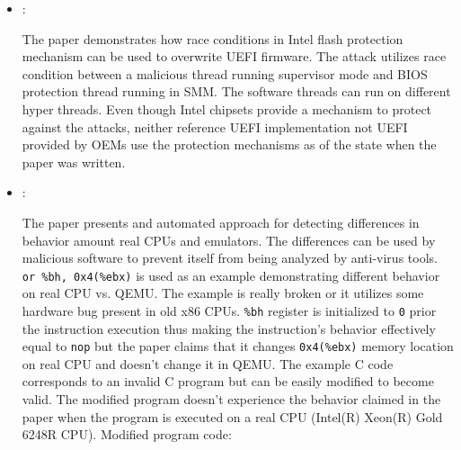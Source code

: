 \begin{itemize}
    \item \cite{Kallenberg:SpeedRacer:2014}:

    The paper demonstrates how race conditions in Intel flash protection mechanism can be used to overwrite UEFI firmware. The attack utilizes race condition between a malicious thread running supervisor mode and BIOS protection thread running in SMM. The software threads can run on different hyper threads. Even though Intel chipsets provide a mechanism to protect against the attacks, neither reference UEFI implementation not UEFI provided by OEMs use the protection mechanisms as of the state when the paper was written.

    \item \cite{Paleari:EmulatorDetection:2009}:

    The paper presents and automated approach for detecting differences in behavior amount real CPUs and emulators. The differences can be used by malicious software to prevent itself from being analyzed by anti-virus tools. \texttt{or \%bh, 0x4(\%ebx)} is used as an example demonstrating different behavior on real CPU vs. QEMU. The example is really broken or it utilizes some hardware bug present in old x86 CPUs. \texttt{\%bh} register is initialized to \texttt{0} prior the instruction execution thus making the instruction's behavior effectively equal to \texttt{nop} but the paper claims that it changes \texttt{0x4(\%ebx)} memory location on real CPU and doesn't change it in QEMU. The example C code corresponds to an invalid C program but can be easily modified to become valid. The modified program doesn't experience the behavior claimed in the paper when the program is executed on a real CPU (Intel(R) Xeon(R) Gold 6248R CPU). Modified program code:

    
\end{itemize}

